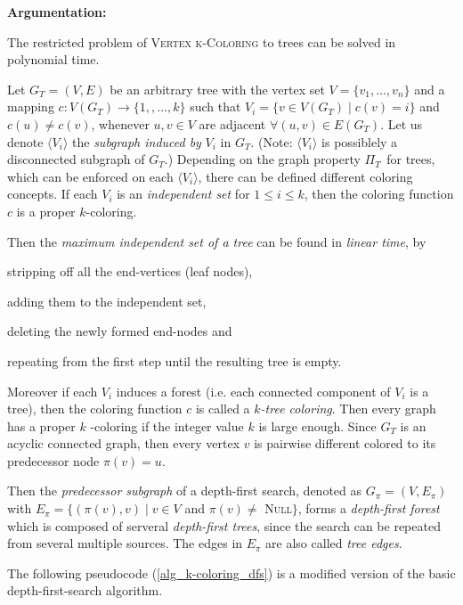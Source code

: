 \documentclass[11pt]{article}
\begin{document}
\noindent \textbf{Argumentation:}

The restricted problem of \textsc{Vertex k-Coloring} to trees can be solved
in polynomial time.

Let $G_{T}=(V,E)$ be an arbitrary tree with the vertex set $V=\{v_{1},\ldots
,v_{n}\}$ and a mapping $c:V(G_{T})\rightarrow \{1,,\ldots ,k\}$ such that $%
V_{i}=\{v\in V(G_{T})\mid c(v)=i\}$ and $c(u)\neq c(v)$, whenever $u,v\in V$
are adjacent $\forall (u,v)\in E(G_{T})$. Let us denote $\langle
V_{i}\rangle $ the \textit{subgraph induced by }$V_{i}$ in $G_{T}.$ (Note: $%
\langle V_{i}\rangle $ is possiblely a disconnected subgraph of $G_{T}$.)
Depending on the graph property $\Pi _{T\text{ }}$for trees, which can be
enforced on each $\langle V_{i}\rangle $, there can be defined different
coloring concepts. If each $V_{i}$ is an \textit{independent set} for $1\leq
i\leq k$, then the coloring function $c$ is a proper $k$-coloring.

Then the \textit{maximum independent set of a tree} can be found in \textit{%
linear time}, by 
\begin{inparaenum}[\itshape 1\upshape)]
\item stripping off all the end-vertices (leaf nodes),
\item adding them to the independent set,
\item deleting the newly formed end-nodes and
\item repeating from the first step until the resulting tree is empty.
\end{inparaenum}Moreover if each $V_{i}$ induces a forest (i.e. each
connected component of $V_{i}$ is a tree), then the coloring function $c$ is
called a $k$\textit{-tree coloring}. Then every graph has a proper $k$%
-coloring if the integer value $k$ is large enough. Since $G_{T}$ is an
acyclic connected graph, then every vertex $v$ is pairwise different colored
to its predecessor node $\pi (v)=u$.

Then the \textit{predecessor subgraph} of a depth-first search, denoted as $%
G_{\pi }=(V,E_{\pi })$ with $E_{\pi }=\{(\pi (v),v)\mid v\in V$ and $\pi
(v)\neq $ \textsc{Null}$\}$, forms a \textit{depth-first forest} which is
composed of serveral \textit{depth-first trees}, since the search can be
repeated from several multiple sources. The edges in $E_{\pi }$ are also
called \textit{tree edges}.

The following pseudocode (\ref{alg_k-coloring_dfs}) is a modified version of
the basic depth-first-search algorithm.
\end{document}
